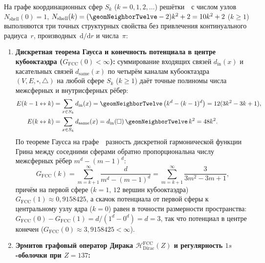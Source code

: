 \begin{theorem}[Дискретный графовый оператор Дирака на координационных сферах кубооктаэдра и отсутствие континуальной сингулярности при $Z=137$]
\label{thm:chem-fcc-graph-dirac-operator}
На графе координационных сфер $S_k$ ($k = 0,1,2,\ldots$) решётки~\latGCKshort\ с числом узлов $N_{\mathrm{shell}}(0)=1$, $N_{\mathrm{shell}}(k) = (\geomNeighborTwelve - 2)k^2 + 2 = 10k^2 + 2$ ($k\ge 1$) выполняются три точных структурных свойства без привлечения континуального радиуса~$r$, производных~$\mathrm{d}/\mathrm{d}r$ и числа~$\pi$:
\begin{enumerate}[leftmargin=*]
\item \textbf{Дискретная теорема Гаусса и конечность потенциала в центре кубооктаэдра ($G_{\mathrm{FCC}}(0) < \infty$):}
  суммирование входящих связей $d_{\mathrm{in}}(x)$ и касательных связей $d_{\mathrm{same}}(x)$ по четырём каналам кубооктаэдра $(V,E,\square,\triangle)$ на любой сфере $S_k$ ($k\ge 1$) даёт точные полиномы числа межсферных и внутрисферных рёбер:
  \begin{equation}
  \label{eq:chem-fcc-discrete-gauss-edges}
  \begin{aligned}
    E(k-1 \leftrightarrow k) &= \sum_{x\in S_k} d_{\mathrm{in}}(x) = \geomNeighborTwelve\,\bigl(k^d - (k-1)^d\bigr) = 12(3k^2 - 3k + 1),\\
    E(k \leftrightarrow k) &= \sum_{x\in S_k} d_{\mathrm{same}}(x) = d_{\mathrm{in}}(\square)\,\geomNeighborTwelve\,k^2 = 48k^2.
  \end{aligned}
  \end{equation}
  По теореме Гаусса на графе~\latGCKshort\ разность дискретной гармонической функции Грина между соседними сферами обратно пропорциональна числу межсферных рёбер $m^d - (m-1)^d$:
  \begin{equation}
  \label{eq:chem-fcc-harmonic-green}
    G_{\mathrm{FCC}}(k) = \sum_{m=k+1}^{\infty} \frac{d}{m^d - (m-1)^d} = \sum_{m=k+1}^{\infty} \frac{3}{3m^2 - 3m + 1},
  \end{equation}
  причём на первой сфере ($k=1$, $12$ вершин кубооктаэдра) $G_{\mathrm{FCC}}(1) \approx 0{,}9158425$, а скачок потенциала от первой сферы к центральному узлу ядра ($k=0$) равен в точности размерности пространства: $G_{\mathrm{FCC}}(0) - G_{\mathrm{FCC}}(1) = d/(1^d - 0^d) = d = 3$, так что потенциал в центре конечен ($G_{\mathrm{FCC}}(0) \approx 3{,}9158425 < \infty$).
\item \textbf{Эрмитов графовый оператор Дирака $\mathcal{H}_{\mathrm{Dirac}}^{\mathrm{FCC}}(Z)$ и регулярность $1s$-оболочки при $Z=137$:}

\end{enumerate}
\end{theorem}
